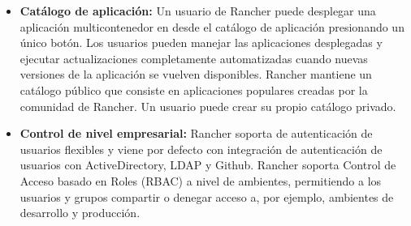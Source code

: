 \begin{itemize}
  \item \textbf{Catálogo de aplicación:}
    Un usuario de Rancher puede desplegar una aplicación multicontenedor en
     desde el catálogo de aplicación presionando un único botón.
    Los usuarios pueden manejar las aplicaciones desplegadas y ejecutar
    actualizaciones completamente automatizadas cuando nuevas versiones de la
    aplicación se vuelven disponibles. Rancher mantiene un catálogo público que
    consiste en aplicaciones populares creadas por la comunidad de Rancher. Un
    usuario puede crear su propio catálogo privado.

  \item \textbf{Control de nivel empresarial:}
    Rancher soporta  de autenticación de usuarios flexibles y viene por defecto con integración de autenticación de usuarios con
    ActiveDirectory, LDAP y Github. Rancher soporta Control de Acceso basado en
    Roles (RBAC) a nivel de ambientes, permitiendo a los usuarios y grupos
    compartir o denegar acceso a, por ejemplo, ambientes de desarrollo y
    producción.

\end{itemize}

\clearpage
